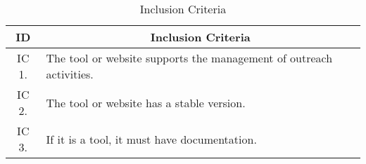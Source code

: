 \begin{table}[!htb]
  \centering
  \caption{Inclusion Criteria}
  \label{tbl:gl-inclusion-criteria}
  \footnotesize
  \begin{tabular}{c|l}
    \bottomrule
    \rowcolor[rgb]{0.753,0.753,0.753} \textbf{ID} & \multicolumn{1}{c}{\textbf{Inclusion Criteria}}                     \\
    \hline
    \rowcolor[HTML]{DEDEDE}
    IC 1.                                         & The tool or website supports the management of outreach activities. \\
    IC 2.                                         & The tool or website has a stable version.                           \\
    \rowcolor[HTML]{DEDEDE}
    IC 3.                                         & If it is a tool, it must have documentation.                        \\
    \toprule
  \end{tabular}
\end{table}